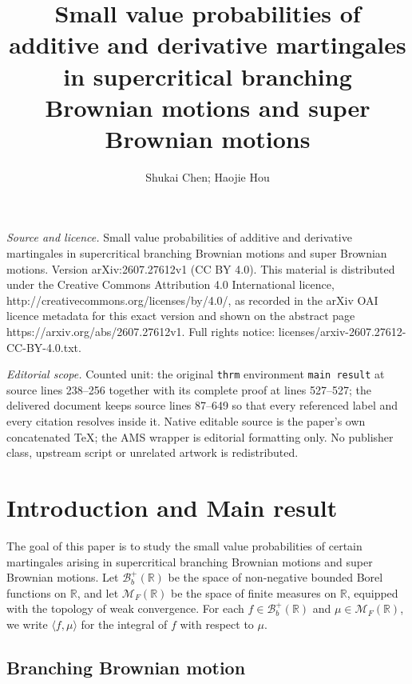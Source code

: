 \documentclass[10pt,a4paper]{amsart}
\numberwithin{equation}{section}
\begin{document}
\title[Small value probabilities of additive and derivative marting]{Small value probabilities of additive and derivative martingales in supercritical branching Brownian motions and super Brownian motions}
\author{Shukai Chen; Haojie Hou}
\date{}
\maketitle
\noindent\emph{Source and licence.} Small value probabilities of additive and derivative martingales in supercritical branching Brownian motions and super Brownian motions. Version arXiv:2607.27612v1 (CC BY 4.0). This material is distributed under the Creative Commons Attribution 4.0 International licence, http://creativecommons.org/licenses/by/4.0/, as recorded in the arXiv OAI licence metadata for this exact version and shown on the abstract page https://arxiv.org/abs/2607.27612v1. Full rights notice: licenses/arxiv-2607.27612-CC-BY-4.0.txt.\par\smallskip
\noindent\textit{Editorial scope.} Counted unit: the original \texttt{thrm} environment \texttt{main result} at source lines 238--256 together with its complete proof at lines 527--527; the delivered document keeps source lines 87--649 so that every referenced label and every citation resolves inside it. Native editable source is the paper's own concatenated TeX; the AMS wrapper is editorial formatting only. No publisher class, upstream script or unrelated artwork is redistributed.
\section{Introduction and Main result}


The goal of this paper is to study the small value probabilities of certain martingales arising in supercritical branching Brownian motions and super Brownian motions. Let $\mathcal{B}_b^+(\mathbb{R})$ be the space of  non-negative bounded Borel functions on $\mathbb{R}$, and let $\mathcal{M}_F(\mathbb{R})$ be the space of finite measures on $\mathbb{R}$, equipped with the topology of weak convergence. For each $f \in \mathcal{B}_b^+(\mathbb{R})$ and $\mu \in \mathcal{M}_F(\mathbb{R})$, we write $\langle f, \mu\rangle$ for the integral of $f$ with respect to $\mu$.

\subsection{Branching Brownian motion}
\end{document}
